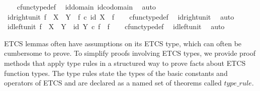 \begin{isabellebody}
\ \ %
\endisadelimproof
%
\isatagproof
{}\isamarkupfalse%
\ cfunc{\isacharunderscore}{\kern0pt}type{\isacharunderscore}{\kern0pt}def\ \isamarkupfalse%
\ id{\isacharunderscore}{\kern0pt}domain\ id{\isacharunderscore}{\kern0pt}codomain\ \isamarkupfalse%
\ auto%
\endisatagproof
{\isafoldproof}%
%
\isadelimproof
\isanewline
%
\endisadelimproof
\isanewline
{}\isamarkupfalse%
\ id{\isacharunderscore}{\kern0pt}right{\isacharunderscore}{\kern0pt}unit{}{\isacharcolon}{\kern0pt}\ {\isachardoublequoteopen}f\ {\isacharcolon}{\kern0pt}\ X\ {\isasymrightarrow}\ Y\ {\isasymLongrightarrow}\ f\ {\isasymcirc}\isactrlsub c\ id\ X\ {\isacharequal}{\kern0pt}\ f{\isachardoublequoteclose}\isanewline
%
\isadelimproof
\ \ %
\endisadelimproof
%
\isatagproof
{}\isamarkupfalse%
\ cfunc{\isacharunderscore}{\kern0pt}type{\isacharunderscore}{\kern0pt}def\ \isamarkupfalse%
\ id{\isacharunderscore}{\kern0pt}right{\isacharunderscore}{\kern0pt}unit\ \isamarkupfalse%
\ auto%
\endisatagproof
{\isafoldproof}%
%
\isadelimproof
\isanewline
%
\endisadelimproof
\isanewline
{}\isamarkupfalse%
\ id{\isacharunderscore}{\kern0pt}left{\isacharunderscore}{\kern0pt}unit{}{\isacharcolon}{\kern0pt}\ {\isachardoublequoteopen}f\ {\isacharcolon}{\kern0pt}\ X\ {\isasymrightarrow}\ Y\ {\isasymLongrightarrow}\ id\ Y\ {\isasymcirc}\isactrlsub c\ f\ {\isacharequal}{\kern0pt}\ f{\isachardoublequoteclose}\isanewline
%
\isadelimproof
\ \ %
\endisadelimproof
%
\isatagproof
{}\isamarkupfalse%
\ cfunc{\isacharunderscore}{\kern0pt}type{\isacharunderscore}{\kern0pt}def\ \isamarkupfalse%
\ id{\isacharunderscore}{\kern0pt}left{\isacharunderscore}{\kern0pt}unit\ \isamarkupfalse%
\ auto%
\endisatagproof
{\isafoldproof}%
%
\isadelimproof
%
\endisadelimproof
%
\isadelimdocument
%
\endisadelimdocument
%
\isatagdocument
%
\isamarkuptrue%
%
\endisatagdocument
{\isafolddocument}%
%
\isadelimdocument
%
\endisadelimdocument
%
\begin{isamarkuptext}%
ETCS lemmas often have assumptions on its ETCS type, which can often be cumbersome to prove.
  To simplify proofs involving ETCS types, we provide proof methods that apply type rules in a
  structured way to prove facts about ETCS function types.
  The type rules state the types of the basic constants and operators of ETCS and are declared as
  a named set of theorems called $type\_rule$.%

\end{isamarkuptext}
\end{isabellebody}
